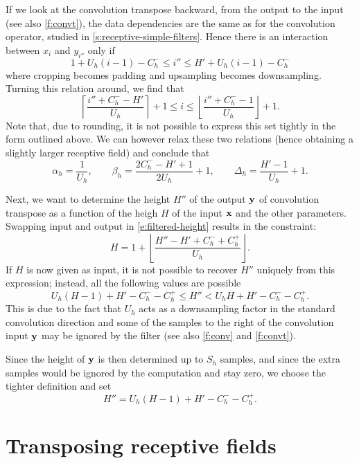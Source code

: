 If we look at the convolution transpose backward, from the output to the input (see also \cref{f:convt}), the data dependencies are the same as for the convolution operator, studied in \cref{s:receptive-simple-filters}. Hence there is an interaction between $x_i$ and $y_{i''}$ only if
\begin{equation}\label{e:convt-bounds}
   1 + U_h(i - 1) - C_h^- \leq i'' \leq H' + U_h(i - 1) - C_h^-
\end{equation}
where cropping becomes padding and upsampling becomes downsampling. Turning this relation around, we find that
\[
 \left\lceil \frac{i'' + C_h^- -H'}{U_h} \right\rceil + 1
 \leq
 i
 \leq
 \left\lfloor \frac{i'' + C_h^- - 1}{U_h} \right\rfloor + 1 .
\]
Note that, due to rounding, it is not possible to express this set tightly in the form outlined above. We can however relax these two relations (hence obtaining a slightly larger receptive field) and conclude that
\[
\alpha_h = \frac{1}{U_h},
\qquad
\beta_h = \frac{2C_h^- - H' + 1}{2 U_h} + 1,
\qquad
\Delta_h = \frac{H' -1}{U_h} + 1.
\]

Next, we want to determine the height $H''$ of the output $\mathbf{y}$ of convolution transpose as a function of the heigh $H$ of the input $\mathbf{x}$ and the other parameters. Swapping input and output in  \eqref{e:filtered-height} results in the constraint:
\[
H = 1+ \left\lfloor \frac{H'' - H' + C_h^- + C_h^+}{U_h} \right\rfloor.
\]
If $H$ is now given as input, it is not possible to recover $H''$ uniquely from this expression; instead, all the following values are possible
\[
   U_h (H-1) +H' -  C_h^- - C_h^+ \leq H'' < U_h H +H' -  C_h^- - C_h^+.
\]
This is due to the fact that $U_h$ acts as a downsampling factor in the standard convolution direction and some of the samples to the right of the convolution input $\mathbf{y}$ may be ignored by the filter (see also \cref{f:conv} and \cref{f:convt}).

Since the height of $\mathbf{y}$ is then determined up to $S_h$ samples, and since the extra samples would be ignored by the computation and stay zero, we choose the tighter definition and set
\[
H'' =  U_h (H-1) +H' -  C_h^- - C_h^+.
\]

\section{Transposing receptive fields}\label{s:receptive-transposing}

